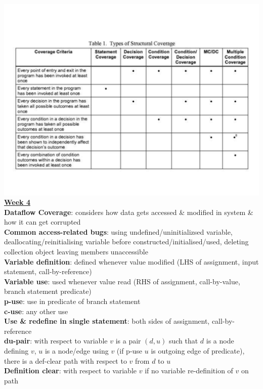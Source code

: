 \documentclass[a4paper]{article}
\begin{document}
\begin{multicols}{3}
        \includegraphics[width=\linewidth]{152.pdf}\\
        \vfill\null\columnbreak\noindent\underline{\textbf{Week 4}}\\
        \textbf{Dataflow Coverage}: considers how data gets accessed \& modified in system \& how it can get corrupted\\
        \textbf{Common access-related bugs}: using undefined/uninitializsed variable, deallocating/reinitialising variable before constructed/initialised/used, deleting collection object leaving members unaccessible\\
        \textbf{Variable definition}: defined whenever value modified (LHS of assignment, input statement, call-by-reference)\\
        \textbf{Variable use}: used whenever value read (RHS of assignment, call-by-value, branch statement predicate)\\
        \textbf{p-use}: use in predicate of branch statement\\
        \textbf{c-use}: any other use\\
        \textbf{Use \& redefine in single statement}: both sides of assignment, call-by-reference\\
        \textbf{du-pair}: with respect to variable $v$ is a pair $(d,u)$ such that $d$ is a node defining $v$, $u$ is a node/edge using $v$ (if p-use $u$ is outgoing edge of predicate), there is a def-clear path with respect to $v$ from $d$ to $u$\\
        \textbf{Definition clear}: with respect to variable $v$ if no variable re-definition of $v$ on path\\

\end{multicols}
\end{document}
